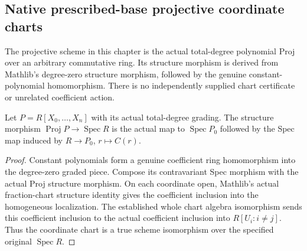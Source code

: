 \subsection{Native prescribed-base projective coordinate charts}
\label{subsec:native-projective-point-charts}

The projective scheme in this chapter is the actual total-degree polynomial
Proj over an arbitrary commutative ring. Its structure morphism is derived
from Mathlib's degree-zero structure morphism, followed by the genuine
constant-polynomial homomorphism. There is no independently supplied chart
certificate or unrelated coefficient action.

\begin{definition}
\label{projective:native-structure-morphism}
\leanok
{}
Let $P=R[X_0,\ldots,X_n]$ with its actual total-degree grading. The
structure morphism $\operatorname{Proj}P\to\operatorname{Spec}R$ is the
actual map to $\operatorname{Spec}P_0$ followed by the Spec map induced
by $R\to P_0$, $r\mapsto C(r)$.
\end{definition}
\begin{proof}
Constant polynomials form a genuine coefficient ring homomorphism into
the degree-zero graded piece. Compose its contravariant Spec morphism
with the actual Proj structure morphism. On each coordinate open, Mathlib's
actual fraction-chart structure identity gives the coefficient inclusion
into the homogeneous localization. The established whole chart algebra
isomorphism sends this coefficient inclusion to the actual coefficient
inclusion into $R[U_i:i\ne j]$. Thus the coordinate chart is a true scheme
isomorphism over the specified original $\operatorname{Spec}R$.
\end{proof}

